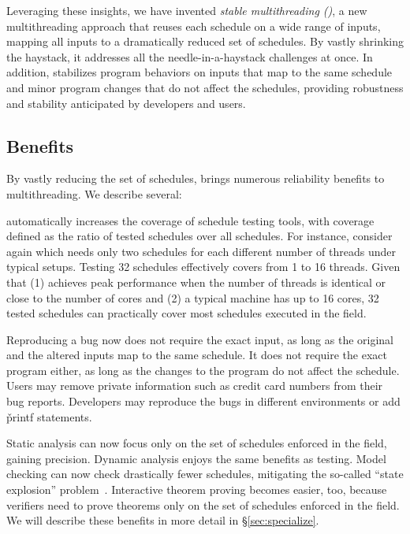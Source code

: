 Leveraging these insights, we have invented \emph{stable multithreading
  (\smt)}, a new multithreading approach that reuses each schedule on a wide
range of inputs, mapping all inputs to a dramatically reduced set of schedules.
By vastly shrinking the haystack, it addresses all the needle-in-a-haystack
challenges at once.  In addition, \smt stabilizes program behaviors
on inputs that map to the same schedule and minor program changes that
do not affect the schedules, providing robustness and stability
anticipated by developers and users.

\subsection{Benefits}

By vastly reducing the set of schedules, \smt brings numerous reliability
benefits to multithreading.  We describe several:

 \smt automatically
increases the coverage of schedule testing tools, with coverage
defined as the ratio of tested schedules over all schedules.
For instance, consider \pbzip again which needs only two
schedules for each different number of threads under typical setups.  Testing 32
schedules effectively covers from 1 to 16 threads.  Given that (1) \pbzip
achieves peak performance when the number of threads is identical or close to
the number of cores and (2) a typical machine has up to 16 cores, 32 tested
schedules can practically cover most schedules executed in the field.

 Reproducing a bug now does not require the exact input,
as long as the original and the altered inputs map to the same schedule.
It does not require the exact program either, as long as the changes to
the program do not affect the schedule.  Users may remove private
information such as credit card numbers from their bug reports. Developers
may reproduce the bugs in different environments or add \v{printf}
statements.

 Static analysis can now focus
only on the set of schedules enforced in the field, gaining
precision.  Dynamic analysis enjoys the same benefits as testing.  Model
checking can now check drastically fewer schedules, mitigating the so-called
``state explosion'' problem~\cite{clarke:ModelChecking}.  Interactive theorem
proving becomes easier, too, because verifiers need to prove theorems only on
the set of schedules enforced in the field.  We will describe these benefits in
more detail in \S\ref{sec:specialize}.


